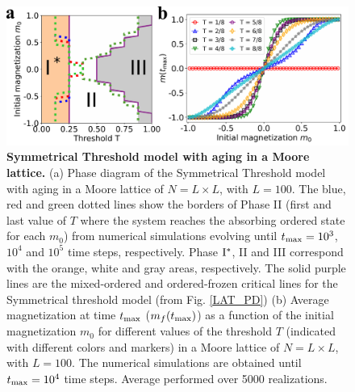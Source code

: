 	\begin{figure}[b]
		 \centering
		 \includegraphics[width=\textwidth]{Figs/Aging_STM/FIG11.pdf}
		 \caption{\label{LAT_PDAGING} \textbf{Symmetrical Threshold model with aging in a Moore lattice.} (a) Phase diagram of the Symmetrical Threshold model with aging in a Moore lattice of $N = L \times L$, with $L = 100$. The blue, red and green dotted lines show the borders of Phase II (first and last value of $T$ where the system reaches the absorbing ordered state for each $m_0$) from numerical simulations evolving until $t_{\rm max} = 10^3$, $10^4$ and $10^5$ time steps, respectively. Phase ${\rm I}^{*}$, II and III correspond with the orange, white and gray areas, respectively. The solid purple lines are the mixed-ordered and ordered-frozen critical lines for the Symmetrical threshold model (from Fig. \ref{LAT_PD}) (b) Average magnetization at time $t_{\rm max}$ ($m_f(t_{\rm max})$) as a function of the initial magnetization $m_0$ for different values of the threshold $T$ (indicated with different colors and markers) in a Moore lattice of $N = L \times L$, with $L = 100$. The numerical simulations are obtained until $t_{\rm max} = 10^4$ time steps. Average performed over 5000 realizations.}
	\end{figure}
	

